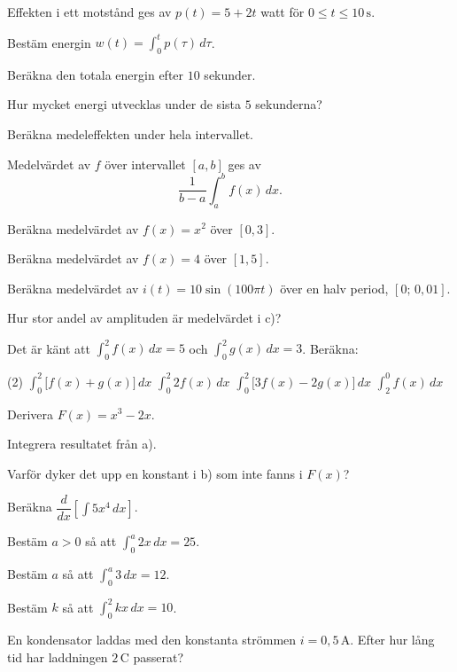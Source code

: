 Effekten i ett motstånd ges av $p(t) = 5 + 2t$ watt för $0 \leq t \leq 10\,\text{s}$.
\begin{parts}
  \item Bestäm energin $w(t) = \displaystyle\int_0^t p(\tau)\,d\tau$.
  \item Beräkna den totala energin efter $10$ sekunder.
  \item Hur mycket energi utvecklas under de sista $5$ sekunderna?
  \item Beräkna medeleffekten under hela intervallet.
\end{parts}

Medelvärdet av $f$ över intervallet $[a, b]$ ges av
\[
  \frac{1}{b - a}\int_a^b f(x)\,dx.
\]
\begin{parts}
  \item Beräkna medelvärdet av $f(x) = x^2$ över $[0, 3]$.
  \item Beräkna medelvärdet av $f(x) = 4$ över $[1, 5]$.
  \item Beräkna medelvärdet av $i(t) = 10\sin(100\pi t)$ över en halv period,
    $[0;\, 0{,}01]$.
  \item Hur stor andel av amplituden är medelvärdet i c)?
\end{parts}

Det är känt att $\displaystyle\int_0^2 f(x)\,dx = 5$ och $\displaystyle\int_0^2 g(x)\,dx = 3$.
Beräkna:
\begin{delar}(2)
  \task $\displaystyle\int_0^2 \bigl[f(x) + g(x)\bigr]\,dx$
  \task $\displaystyle\int_0^2 2f(x)\,dx$
  \task $\displaystyle\int_0^2 \bigl[3f(x) - 2g(x)\bigr]\,dx$
  \task $\displaystyle\int_2^0 f(x)\,dx$
\end{delar}

\begin{parts}
  \item Derivera $F(x) = x^3 - 2x$.
  \item Integrera resultatet från a).
  \item Varför dyker det upp en konstant i b) som inte fanns i $F(x)$?
  \item Beräkna $\dfrac{d}{dx}\left[\displaystyle\int 5x^4\,dx\right]$.
\end{parts}

\begin{parts}
  \item Bestäm $a > 0$ så att $\displaystyle\int_0^a 2x\,dx = 25$.
  \item Bestäm $a$ så att $\displaystyle\int_0^a 3\,dx = 12$.
  \item Bestäm $k$ så att $\displaystyle\int_0^2 kx\,dx = 10$.
  \item En kondensator laddas med den konstanta strömmen $i = 0{,}5\,\text{A}$. Efter hur lång tid
    har laddningen $2\,\text{C}$ passerat?
\end{parts}

